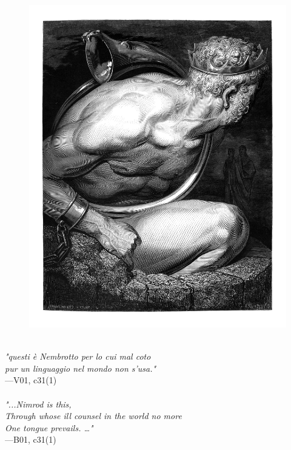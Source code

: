 \documentclass[../Dore_vision.tex]{subfiles}
\begin{document}
\begin{figure}[ht]
\centering
\includegraphics[height=\figsize]{illustrations/book_1/V01, c31(1).jpg}
\end{figure}

\begin{center}
\begin{minipage}{0.8\linewidth}
\textit{\\
"questi è Nembrotto per lo cui mal coto\\pur un linguaggio nel mondo non s’usa."} \\
—V01, c31(1) \\~\\
\textit{"...Nimrod is this,\\Through whose ill counsel in the world no more\\One tongue prevails. …"} \\
—B01, c31(1)
\end{minipage}
\end{center}

\newpage
\end{document}

